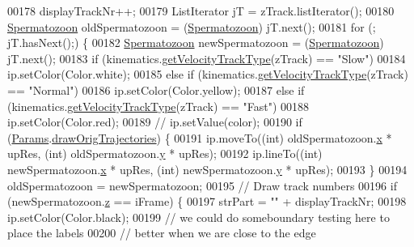\begin{DoxyCode}
00178         displayTrackNr++;
00179         ListIterator jT = zTrack.listIterator();
00180         \hyperlink{classdata_1_1_spermatozoon}{Spermatozoon} oldSpermatozoon = (\hyperlink{classdata_1_1_spermatozoon}{Spermatozoon}) jT.next();
00181         \textcolor{keywordflow}{for} (; jT.hasNext();) \{
00182           \hyperlink{classdata_1_1_spermatozoon}{Spermatozoon} newSpermatozoon = (\hyperlink{classdata_1_1_spermatozoon}{Spermatozoon}) jT.next();
00183           \textcolor{keywordflow}{if} (kinematics.\hyperlink{classfunctions_1_1_kinematics_a55fee1cc65c19a5862bd9fdce3aa9cd5}{getVelocityTrackType}(zTrack) == \textcolor{stringliteral}{"Slow"})
00184             ip.setColor(Color.white);
00185           \textcolor{keywordflow}{else} \textcolor{keywordflow}{if} (kinematics.\hyperlink{classfunctions_1_1_kinematics_a55fee1cc65c19a5862bd9fdce3aa9cd5}{getVelocityTrackType}(zTrack) == \textcolor{stringliteral}{"Normal"})
00186             ip.setColor(Color.yellow);
00187           \textcolor{keywordflow}{else} \textcolor{keywordflow}{if} (kinematics.\hyperlink{classfunctions_1_1_kinematics_a55fee1cc65c19a5862bd9fdce3aa9cd5}{getVelocityTrackType}(zTrack) == \textcolor{stringliteral}{"Fast"})
00188             ip.setColor(Color.red);
00189           \textcolor{comment}{// ip.setValue(color);}
00190           \textcolor{keywordflow}{if} (\hyperlink{classdata_1_1_params}{Params}.\hyperlink{classdata_1_1_params_a207f2cfc882f842eafc04f6531308e98}{drawOrigTrajectories}) \{
00191             ip.moveTo((\textcolor{keywordtype}{int}) oldSpermatozoon.\hyperlink{classdata_1_1_spermatozoon_ad0da36b2558901e21e7a30f6c227a45e}{x} * upRes, (\textcolor{keywordtype}{int}) oldSpermatozoon.\hyperlink{classdata_1_1_spermatozoon_aa4f0d3eebc3c443f9be81bf48561a217}{y} * upRes);
00192             ip.lineTo((\textcolor{keywordtype}{int}) newSpermatozoon.\hyperlink{classdata_1_1_spermatozoon_ad0da36b2558901e21e7a30f6c227a45e}{x} * upRes, (\textcolor{keywordtype}{int}) newSpermatozoon.\hyperlink{classdata_1_1_spermatozoon_aa4f0d3eebc3c443f9be81bf48561a217}{y} * upRes);
00193           \}
00194           oldSpermatozoon = newSpermatozoon;
00195           \textcolor{comment}{// Draw track numbers}
00196           \textcolor{keywordflow}{if} (newSpermatozoon.\hyperlink{classdata_1_1_spermatozoon_a14f94e529dff0b8bfba8e16fbe9755d6}{z} == iFrame) \{
00197             strPart = \textcolor{stringliteral}{""} + displayTrackNr;
00198             ip.setColor(Color.black);
00199             \textcolor{comment}{// we could do someboundary testing here to place the labels}
00200             \textcolor{comment}{// better when we are close to the edge}

\end{DoxyCode}
